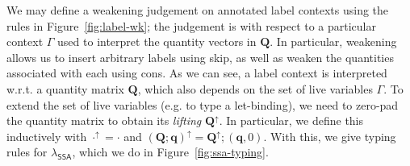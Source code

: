 \documentclass[acmsmall,screen,review]{acmart}
\newcommand{\mb}[1]{\ensuremath{\mathbf{#1}}}
\newcommand{\ms}[1]{\ensuremath{\mathsf{#1}}}
\newcommand{\lwk}[3]{#1 \vdash #2 \rightsquigarrow #3}
\newcommand{\rle}[1]{{\scriptsize\textsf{#1}}}
\newcommand{\brle}[1]{{\textsf{#1}}}
\newcommand{\subiterexp}{\texorpdfstring{\(\lambda_{\ms{iter}}\)}{lambda-iter}}
\newcommand{\isotopessa}{\(\lambda_{\ms{SSA}}\)}
\newcommand{\zeroqv}[1]{#1^\uparrow}
\begin{document}
We may define a weakening judgement on annotated label contexts using the rules in
Figure~\ref{fig:label-wk}; the judgement is with respect to a particular context $\Gamma$ used to
interpret the quantity vectors in $\mb{Q}$. In particular, weakening allows us to  insert arbitrary
labels using \brle{skip}, as well as weaken the quantities associated with each using \brle{cons}.
As we can see, a label context is interpreted w.r.t. a quantity matrix $\mb{Q}$, which also depends
on the set of live variables $\Gamma$. To extend the set of live variables (e.g. to type a
let-binding), we need to zero-pad the quantity matrix to obtain its \emph{lifting}
$\zeroqv{\mb{Q}}$. In particular, we define this inductively with 
$
  \zeroqv{\cdot} = \cdot
$ and
$
  \zeroqv{(\mb{Q}; \mb{q})} = \zeroqv{\mb{Q}} ; (\mb{q}, 0)
$.
%
%
With this, we give typing rules for \isotopessa{}, which we do in Figure~\ref{fig:ssa-typing}.
\end{document}
